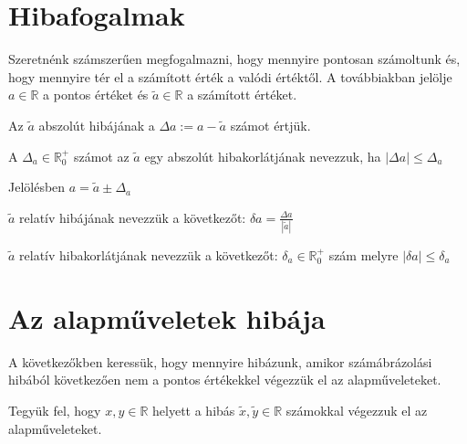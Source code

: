 \section{Hibafogalmak}
Szeretnénk számszerűen megfogalmazni, hogy mennyire pontosan számoltunk és, hogy mennyire tér el a számított érték a valódi értéktől. A továbbiakban jelölje $a \in \mathbb{R}$ a pontos értéket és $\tilde{a} \in \mathbb{R}$ a számított értéket.
\begin{definition}
    Az $\tilde{a}$ abszolút hibájának a $\Delta a := a - \tilde{a}$ számot értjük.
\end{definition}
\begin{definition}
    A $\Delta_{a} \in \mathbb{R}_{0}^{+}$ számot az $\tilde{a}$ egy abszolút hibakorlátjának nevezzuk, ha $|\Delta a| \leq \Delta_{a}$
\end{definition}
Jelölésben $a = \tilde{a} \pm \Delta_a$
\begin{definition}
    $\tilde{a}$ relatív hibájának nevezzük a következőt: $\delta a = \frac{\Delta a}{|\tilde{a}|}$
\end{definition}
\begin{definition}
    $\tilde{a}$ relatív hibakorlátjának nevezzük a következőt: $\delta_{a} \in \mathbb{R}_{0}^{+}$ szám melyre $|\delta a| \leq \delta_{a}$
\end{definition}

\section{Az alapműveletek hibája}
A következőkben keressük, hogy mennyire hibázunk, amikor számábrázolási hibából következően nem a pontos értékekkel végezzük el az alapműveleteket.

Tegyük fel, hogy $x, y \in \mathbb{R}$ helyett a hibás $\tilde{x},\tilde{y} \in \mathbb{R}$ számokkal végezzuk el az alapműveleteket.

